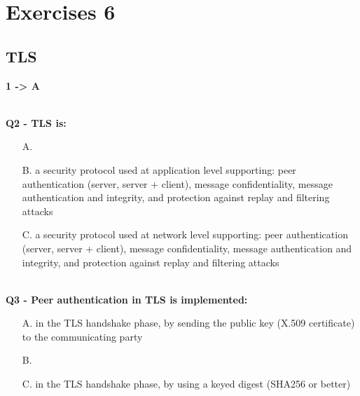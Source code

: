 \chapter{Exercises 6}

\section{TLS}
\textbf{1 -> A}

\textbf{\\Q2 - TLS is:}
\begin{itemize}
    \item[A.] 
    \item[B.] a security protocol used at application level supporting: peer authentication (server, server + client), message confidentiality, message authentication and integrity, and protection against replay and filtering attacks
    \item[C.] a security protocol used at network level supporting: peer authentication (server, server + client), message confidentiality, message authentication and integrity, and protection against replay and filtering attacks
\end{itemize}
 
\textbf{\\Q3 - Peer authentication in TLS is implemented:}
\begin{itemize}
    \item[A.] in the TLS handshake phase, by sending the public key (X.509 certificate) to the communicating party
    \item[B.] 
    \item[C.] in the TLS handshake phase, by using a keyed digest (SHA256 or better)
\end{itemize}
\com{}

